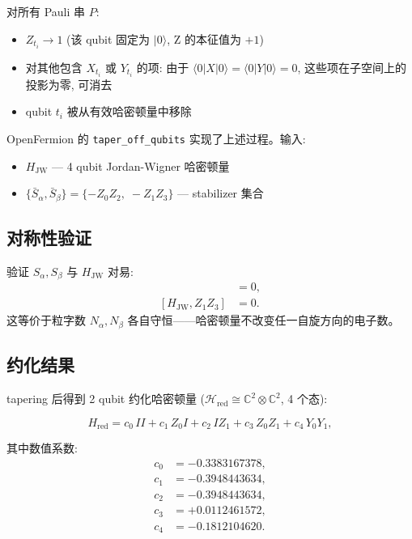 \documentclass[fontset=mac]{ctexart}
\newcommand{\Zop}{Z}
\newcommand{\ket}[1]{|#1\rangle}
\newcommand{\Hred}{\mathcal{H}_{\text{red}}}
\begin{document}
对所有 Pauli 串 $P$:
\begin{itemize}
    \item $Z_{t_i} \to 1$ (该 qubit 固定为 $\ket{0}$, Z 的本征值为 $+1$)
    \item 对其他包含 $X_{t_i}$ 或 $Y_{t_i}$ 的项: 由于 $\langle 0 | X | 0 \rangle = \langle 0 | Y | 0 \rangle = 0$,
          这些项在子空间上的投影为零, 可消去
    \item qubit $t_i$ 被从有效哈密顿量中移除
\end{itemize}

OpenFermion 的 \texttt{taper\_off\_qubits} 实现了上述过程。输入:
\begin{itemize}
    \item $H_{\text{JW}}$ --- 4 qubit Jordan-Wigner 哈密顿量
    \item $\{\bar{S}_\alpha, \bar{S}_\beta\} = \{-\Zop_0\Zop_2, \;-\Zop_1\Zop_3\}$ --- stabilizer 集合
\end{itemize}

\subsection*{对称性验证}

验证 $S_\alpha, S_\beta$ 与 $H_{\text{JW}}$ 对易:
\begin{align}
    [H_{\text{JW}}, \Zop_0\Zop_2] &= 0, \\
    [H_{\text{JW}}, \Zop_1\Zop_3] &= 0.
\end{align}
这等价于粒字数 $N_\alpha, N_\beta$ 各自守恒——哈密顿量不改变任一自旋方向的电子数。

\subsection*{约化结果}

tapering 后得到 2 qubit 约化哈密顿量 ($\Hred \cong \mathbb{C}^2 \otimes \mathbb{C}^2$, 4 个态):

\begin{equation}
\boxed{
H_{\text{red}} = c_0\, II + c_1\, Z_0 I + c_2\, I Z_1 + c_3\, Z_0 Z_1 + c_4\, Y_0 Y_1,
}
\end{equation}

其中数值系数:
\begin{align}
    c_0 &= -0.3383167378, \\
    c_1 &= -0.3948443634, \\
    c_2 &= -0.3948443634, \\
    c_3 &= +0.0112461572, \\
    c_4 &= -0.1812104620.
\end{align}
\end{document}
